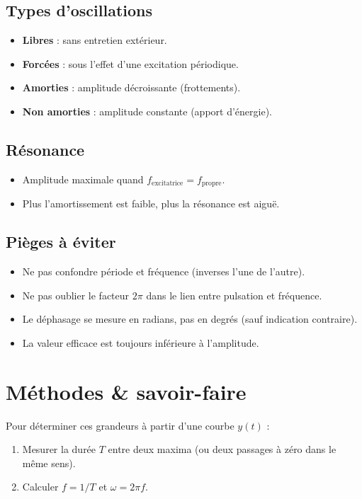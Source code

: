 \begin{synthese}
\subsection*{Types d'oscillations}
\begin{itemize}
\item \textbf{Libres} : sans entretien extérieur.
\item \textbf{Forcées} : sous l'effet d'une excitation périodique.
\item \textbf{Amorties} : amplitude décroissante (frottements).
\item \textbf{Non amorties} : amplitude constante (apport d'énergie).
\end{itemize}

\subsection*{Résonance}
\begin{itemize}
\item Amplitude maximale quand $f_{\text{excitatrice}} = f_{\text{propre}}$.
\item Plus l'amortissement est faible, plus la résonance est aiguë.
\end{itemize}

\subsection*{Pièges à éviter}
\begin{itemize}
\item Ne pas confondre période et fréquence (inverses l'une de l'autre).
\item Ne pas oublier le facteur $2\pi$ dans le lien entre pulsation et fréquence.
\item Le déphasage se mesure en radians, pas en degrés (sauf indication contraire).
\item La valeur efficace est toujours inférieure à l'amplitude.
\end{itemize}
\end{synthese}

\section{Méthodes \& savoir-faire}

Pour déterminer ces grandeurs à partir d'une courbe $y(t)$ :
\begin{enumerate}
\item Mesurer la durée $T$ entre deux maxima (ou deux passages à zéro dans le même sens).
\item Calculer $f = 1/T$ et $\omega = 2\pi f$.
\end{enumerate}

